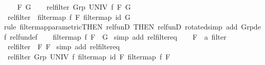 \begin{isabellebody}
\ \ \isamarkupfalse%
\ F\ G\isanewline
\ \ \isamarkupfalse%
\ {\isachardoublequoteopen}rel{\isacharunderscore}{\kern0pt}filter\ {\isacharparenleft}{\kern0pt}Grp\ UNIV\ f{\isacharparenright}{\kern0pt}\ F\ G{\isachardoublequoteclose}\isanewline
\ \ \isamarkupfalse%
\ {\isachardoublequoteopen}rel{\isacharunderscore}{\kern0pt}filter\ {\isacharparenleft}{\kern0pt}{\isacharequal}{\kern0pt}{\isacharparenright}{\kern0pt}\ {\isacharparenleft}{\kern0pt}filtermap\ f\ F{\isacharparenright}{\kern0pt}\ {\isacharparenleft}{\kern0pt}filtermap\ id\ G{\isacharparenright}{\kern0pt}{\isachardoublequoteclose}\isanewline
\ \ \ \ \isamarkupfalse%
{\isacharparenleft}{\kern0pt}rule\ filtermap{\isacharunderscore}{\kern0pt}parametric{\isacharbrackleft}{\kern0pt}THEN\ rel{\isacharunderscore}{\kern0pt}funD{\isacharcomma}{\kern0pt}\ THEN\ rel{\isacharunderscore}{\kern0pt}funD{\isacharcomma}{\kern0pt}\ rotated{\isacharbrackright}{\kern0pt}{\isacharparenright}{\kern0pt}{\isacharparenleft}{\kern0pt}simp\ add{\isacharcolon}{\kern0pt}\ Grp{\isacharunderscore}{\kern0pt}def\ rel{\isacharunderscore}{\kern0pt}fun{\isacharunderscore}{\kern0pt}def{\isacharparenright}{\kern0pt}\isanewline
\ \ \isamarkupfalse%
\ {\isachardoublequoteopen}filtermap\ f\ F\ {\isacharequal}{\kern0pt}\ G{\isachardoublequoteclose}\ \isamarkupfalse%
{\isacharparenleft}{\kern0pt}simp\ add{\isacharcolon}{\kern0pt}\ rel{\isacharunderscore}{\kern0pt}filter{\isacharunderscore}{\kern0pt}eq{\isacharparenright}{\kern0pt}\isanewline
{}\isamarkupfalse%
\isanewline
\ \ \isamarkupfalse%
\ F\ {\isacharcolon}{\kern0pt}{\isacharcolon}{\kern0pt}\ {\isachardoublequoteopen}{\isacharprime}{\kern0pt}a\ filter{\isachardoublequoteclose}\isanewline
\ \ \isamarkupfalse%
\ {\isachardoublequoteopen}rel{\isacharunderscore}{\kern0pt}filter\ {\isacharparenleft}{\kern0pt}{\isacharequal}{\kern0pt}{\isacharparenright}{\kern0pt}\ F\ F{\isachardoublequoteclose}\ \isamarkupfalse%
{\isacharparenleft}{\kern0pt}simp\ add{\isacharcolon}{\kern0pt}\ rel{\isacharunderscore}{\kern0pt}filter{\isacharunderscore}{\kern0pt}eq{\isacharparenright}{\kern0pt}\isanewline
\ \ \isamarkupfalse%
\ {\isachardoublequoteopen}rel{\isacharunderscore}{\kern0pt}filter\ {\isacharparenleft}{\kern0pt}Grp\ UNIV\ f{\isacharparenright}{\kern0pt}\ {\isacharparenleft}{\kern0pt}filtermap\ id\ F{\isacharparenright}{\kern0pt}\ {\isacharparenleft}{\kern0pt}filtermap\ f\ F{\isacharparenright}{\kern0pt}{\isachardoublequoteclose}\isanewline

\end{isabellebody}
